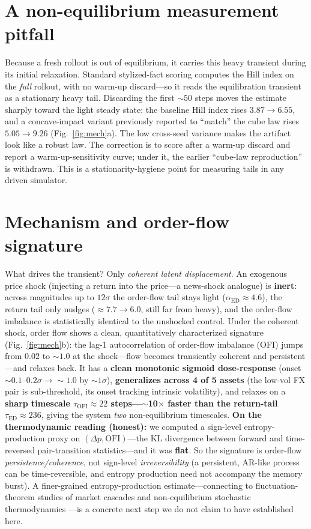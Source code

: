 \documentclass{article}
\begin{document}
\section{A non-equilibrium measurement pitfall}\label{sec:measurement}
Because a fresh rollout is out of equilibrium, it carries this heavy transient during its initial
relaxation. Standard stylized-fact scoring computes the Hill index on the \emph{full} rollout, with no
warm-up discard---so it reads the equilibration transient as a stationary heavy tail. Discarding the
first $\sim\!50$ steps moves the estimate sharply toward the light steady state: the baseline Hill
index rises $3.87\!\to\!6.55$, and a concave-impact variant previously reported to ``match'' the cube
law rises $5.05\!\to\!9.26$ (Fig.~\ref{fig:mech}a). The low cross-seed variance makes the artifact look
like a robust law. The correction is to score after a warm-up discard and report a warm-up-sensitivity
curve; under it, the earlier ``cube-law reproduction'' is withdrawn. This is a stationarity-hygiene
point for measuring tails in any driven simulator.

\section{Mechanism and order-flow signature}\label{sec:mechanism}
What drives the transient? Only \emph{coherent latent displacement}. An exogenous price shock (injecting
a return into the price---a news-shock analogue) is \textbf{inert}: across magnitudes up to $12\sigma$
the order-flow tail stays light ($\alpha_{\mathrm{ED}}\!\approx\!4.6$), the return tail only nudges
($\approx\!7.7\!\to\!6.0$, still far from heavy), and the order-flow imbalance is statistically
identical to the unshocked control. Under the coherent shock, order flow shows a clean, quantitatively
characterized signature (Fig.~\ref{fig:mech}b): the lag-1 autocorrelation of order-flow imbalance (OFI)
jumps from $0.02$ to $\sim\!\mathbf{1.0}$ at the shock---flow becomes transiently coherent and
persistent---and relaxes back. It has a \textbf{clean monotonic sigmoid dose-response} (onset
$\sim\!0.1$--$0.2\sigma\to\sim\!1.0$ by $\sim\!1\sigma$), \textbf{generalizes across 4 of 5 assets} (the
low-vol FX pair is sub-threshold, its onset tracking intrinsic volatility), and relaxes on a
\textbf{sharp timescale $\tau_{\mathrm{OFI}}\!\approx\!22$ steps---$\sim$10$\times$ faster than the
return-tail $\tau_{\mathrm{ED}}\!\approx\!236$}, giving the system \emph{two} non-equilibrium timescales.
\textbf{On the thermodynamic reading (honest):} we computed a sign-level entropy-production proxy on
$(\Delta p,\text{OFI})$---the KL divergence between forward and time-reversed pair-transition
statistics---and it was \textbf{flat}. So the signature is order-flow \emph{persistence/coherence}, not
sign-level \emph{irreversibility} (a persistent, AR-like process can be time-reversible, and entropy
production need not accompany the memory burst). A finer-grained entropy-production estimate---connecting
to fluctuation-theorem studies of market cascades \citep{maskawa2025} and non-equilibrium stochastic
thermodynamics \citep{seifert2012}---is a concrete next step we do not claim to have established here.
\end{document}
